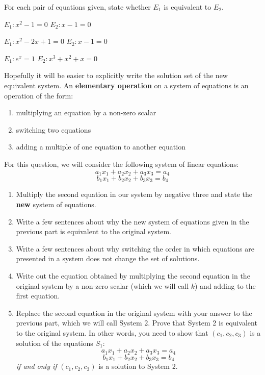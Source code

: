 \bq For each pair of equations given, state whether $E_1$ is equivalent to $E_2$.
\be
\item $E_1: x^2-1=0$ \hfill $E_2: x-1=0$
\item $E_1: x^2-2x+1=0$ \hfill $E_2: x-1=0$
\item $E_1: e^x=1$ \hfill $E_2: x^3+x^2+x=0$
\ee \eq


Hopefully it will be easier to explicitly write the solution set of the new equivalent system. An \textbf{elementary operation} on a system of equations is an operation of the form:
\begin{enumerate}
\item multiplying an equation by a non-zero scalar
\item switching two equations
\item adding a multiple of one equation to another equation
\end{enumerate}

\begin{question}
For this question, we will consider the following system of linear equations:
$$a_1 x_1+a_2x_2+a_3x_3=a_4$$
$$b_1 x_1+b_2x_2+b_3x_3=b_4$$
\begin{enumerate}
\item Multiply the second equation in our system by negative three and state the \textbf{new} system of equations.
\item Write a few sentences about why the new system of equations given in the previous part is equivalent to the original system.
\item Write a few sentences about why switching the order in which equations are presented in a system does not change the set of solutions.
\item Write out the equation obtained by multiplying the second equation in the original system by a non-zero scalar (which we will call $k$) and adding to the first equation.
\item Replace the second equation in the original system with your answer to the previous part, which we will call System 2. Prove that System 2 is equivalent to the original system. In other words, you need to show that $(c_1,c_2,c_3)$ is a solution of the equations $S_1$:
    $$a_1 x_1+a_2x_2+a_3x_3=a_4$$
    $$b_1 x_1+b_2x_2+b_3x_3=b_4$$
    \emph{if and only if} $(c_1,c_2,c_3)$ is a solution to System 2.
\end{enumerate}

\end{question}


